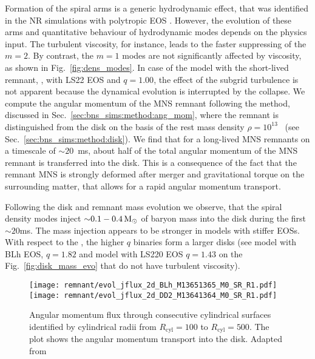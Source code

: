 Formation of the spiral arms is a generic hydrodynamic effect, that was identified 
in the \ac{NR} simulations with polytropic \ac{EOS} \citep{Bernuzzi:2013rza,Radice:2016gym}.
However, the evolution of these arms and quantitative behaviour of hydrodynamic
modes depends on the physics input. The turbulent viscosity, for instance, 
leads to the faster suppressing of the $m=2$. By contrast, the $m=1$ modes are not
significantly affected by viscosity, as shown in Fig.~\ref{fig:dens_modes}.
%
In case of the model with the short-lived remnant, \ie, with LS22 \ac{EOS} and
$q=1.00$, the effect of the subgrid turbulence is not apparent because 
the dynamical evolution is interrupted by the collapse.
%
We compute the angular momentum of the \ac{MNS} remnant following the method,
discussed in Sec.~\ref{sec:bns_sims:method:ang_mom}, where the remnant is distinguished 
from the disk on the basis of the rest mass density $\rho=10^{13}$~\gcm{} 
(see Sec.~\ref{sec:bns_sims:method:disk}).
%
We find that for a long-lived \ac{MNS} remnants on a timescale of $\sim20$~ms, 
about half of the total angular momentum of the \ac{MNS} remnant is transferred 
into the disk. 
This is a consequence of the fact that the remnant \ac{MNS} is strongly deformed 
after merger and gravitational torque on the surrounding matter, 
that allows for a rapid angular momentum transport.

Following the disk and remnant mass evolution we observe, that the spiral 
density modes inject ${\sim}0.1-0.4\,{\text{M}_{\odot}}$ of baryon mass into the disk during the 
first ${\sim}20$ms. 
The mass injection appears to be stronger in models with stiffer \acp{EOS}. 
With respect to the \mr{}, the higher $q$ binaries form a larger disks 
(see model with BLh \ac{EOS}, $q=1.82$ and model with LS220 \ac{EOS} $q=1.43$ 
on the Fig.~\ref{fig:disk_mass_evo} that do not have turbulent viscosity).

\begin{figure}[t]
    \centering 
    \texttt{[image: remnant/evol\_jflux\_2d\_BLh\_M13651365\_M0\_SR\_R1.pdf]}
    \texttt{[image: remnant/evol\_jflux\_2d\_DD2\_M13641364\_M0\_SR\_R1.pdf]}
    \caption{Angular momentum flux through consecutive cylindrical
        surfaces identified by cylindrical radii from $R_{\text{cyl}}=100$ to $R_{\text{cyl}}=500$. The
        plot shows the angular momentum transport into the disk.
        Adapted from \citet{Nedora:2020pak}
    }
    \label{fig:disk_ang_mom_flux_map_blh_q1}
\end{figure}

